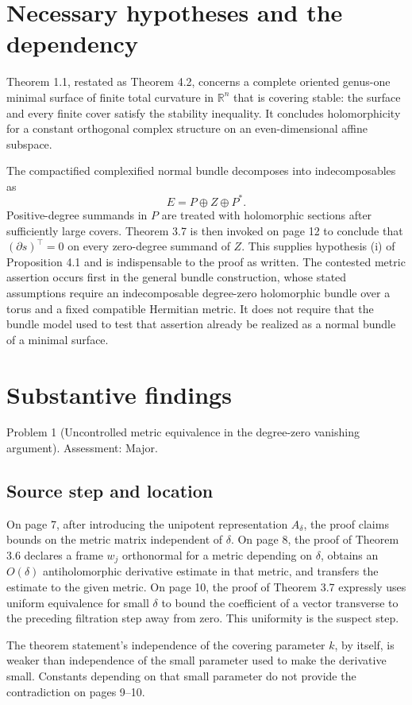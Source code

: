 \documentclass[10pt]{article}
\begin{document}
\section*{Necessary hypotheses and the dependency}
Theorem 1.1, restated as Theorem 4.2, concerns a complete oriented genus-one minimal surface of finite total curvature in \(\mathbb R^n\) that is covering stable: the surface and every finite cover satisfy the stability inequality. It concludes holomorphicity for a constant orthogonal complex structure on an even-dimensional affine subspace.\par
The compactified complexified normal bundle decomposes into indecomposables as \[E=P\oplus Z\oplus P^*.\] Positive-degree summands in \(P\) are treated with holomorphic sections after sufficiently large covers. Theorem 3.7 is then invoked on page 12 to conclude that \((\partial s)^\top=0\) on every zero-degree summand of \(Z\). This supplies hypothesis (i) of Proposition 4.1 and is indispensable to the proof as written. The contested metric assertion occurs first in the general bundle construction, whose stated assumptions require an indecomposable degree-zero holomorphic bundle over a torus and a fixed compatible Hermitian metric. It does not require that the bundle model used to test that assertion already be realized as a normal bundle of a minimal surface.\par
\section*{Substantive findings}
Problem 1 (Uncontrolled metric equivalence in the degree-zero vanishing argument).  Assessment: Major.\par
\subsection*{Source step and location}
On page 7, after introducing the unipotent representation \(A_\delta\), the proof claims bounds on the metric matrix independent of \(\delta\). On page 8, the proof of Theorem 3.6 declares a frame \(w_j\) orthonormal for a metric depending on \(\delta\), obtains an \(O(\delta)\) antiholomorphic derivative estimate in that metric, and transfers the estimate to the given metric. On page 10, the proof of Theorem 3.7 expressly uses uniform equivalence for small \(\delta\) to bound the coefficient of a vector transverse to the preceding filtration step away from zero. This uniformity is the suspect step.\par
The theorem statement’s independence of the covering parameter \(k\), by itself, is weaker than independence of the small parameter used to make the derivative small. Constants depending on that small parameter do not provide the contradiction on pages 9–10.\par
\end{document}
